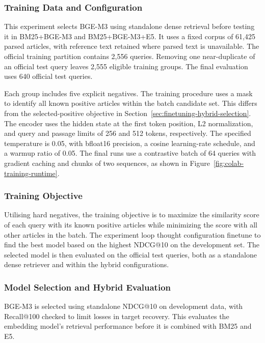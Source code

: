 \subsubsection{Training Data and Configuration}

This experiment selects BGE-M3 using standalone dense retrieval before testing it in BM25+BGE-M3 and BM25+BGE-M3+E5. It uses a fixed corpus of 61,425 parsed articles, with reference text retained where parsed text is unavailable. The official training partition contains 2,556 queries. Removing one near-duplicate of an official test query leaves 2,555 eligible training groups. The final evaluation uses 640 official test queries.

Each group includes five explicit negatives. The training procedure uses a mask to identify all known positive articles within the batch candidate set. This differs from the selected-positive objective in Section~\ref{sec:finetuning-hybrid-selection}. The encoder uses the hidden state at the first token position, L2 normalization, and query and passage limits of 256 and 512 tokens, respectively. The specified temperature is 0.05, with bfloat16 precision, a cosine learning-rate schedule, and a warmup ratio of 0.05. The final runs use a contrastive batch of 64 queries with gradient caching and chunks of two sequences, as shown in Figure~\ref{fig:colab-training-runtime}.

\subsubsection{Training Objective}

Utilising hard negatives, the training objective is to maximize the similarity score of each query with its known positive articles while minimizing the score with all other articles in the batch. The experiment loop thought configuration finetune to find the best model based on the highest NDCG@10 on the development set. The selected model is then evaluated on the official test queries, both as a standalone dense retriever and within the hybrid configurations.

\subsubsection{Model Selection and Hybrid Evaluation}

BGE-M3 is selected using standalone NDCG@10 on development data, with Recall@100 checked to limit losses in target recovery. This evaluates the embedding model's retrieval performance before it is combined with BM25 and E5.

